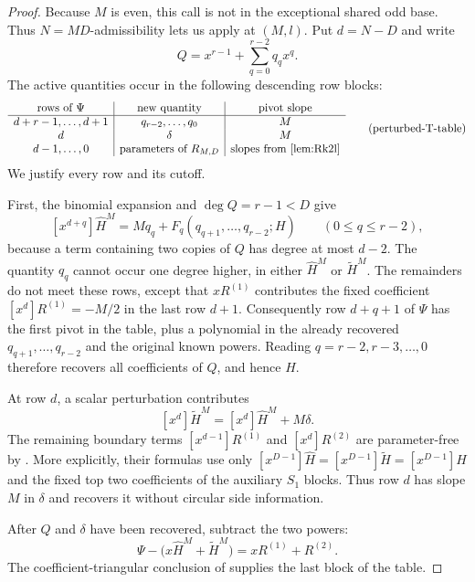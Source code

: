 \begin{proof}
Because $M$ is even, this call is not in the exceptional shared odd base.
Thus $N=MD$-admissibility lets us apply
 at $(M,l)$.
Put $d=N-D$ and write
\[
  Q=x^{r-1}+\sum_{q=0}^{r-2}q_qx^q .
\]
The active quantities occur in the following descending row blocks:
\[
\begin{array}{c|c|c}
  \text{rows of }\Psi&\text{new quantity}&\text{pivot slope}\\ \hline
  d+r-1,\ldots,d+1&q_{r-2},\ldots,q_0&M\\
  d&\delta&M\\
  d-1,\ldots,0&\text{parameters of }R_{M,D}&
       \text{slopes from \Cref{lem:Rk2l}}
\end{array}
\tag{perturbed-T-table}
\]
We justify every row and its cutoff.

First, the binomial expansion and $\deg Q=r-1<D$ give
\[
 [x^{d+q}]\widehat H^M
   =M q_q+F_q(q_{q+1},\ldots,q_{r-2};H)
   \qquad(0\le q\le r-2),
\tag{perturbed-power-pivot}
\]
because a term containing two copies of $Q$ has degree at most $d-2$.
The quantity $q_q$ cannot occur one degree higher, in either
$\widehat H^M$ or $\widetilde H^M$.  The remainders do not meet these rows,
except that $xR^{(1)}$ contributes the fixed coefficient
$[x^d]R^{(1)}=-M/2$ in the last row $d+1$.  Consequently row $d+q+1$ of
$\Psi$ has the first pivot in the table, plus a polynomial in the already
recovered $q_{q+1},\ldots,q_{r-2}$ and the original known powers.  Reading
$q=r-2,r-3,\ldots,0$ therefore recovers all coefficients of $Q$, and hence
$\widehat H$.

At row $d$, a scalar perturbation contributes
\[
 [x^d]\widetilde H^M=[x^d]\widehat H^M+M\delta .
\]
The remaining boundary terms $[x^{d-1}]R^{(1)}$ and
$[x^d]R^{(2)}$ are parameter-free by
.  More explicitly, their formulas use only
$[x^{D-1}]\widehat H=[x^{D-1}]\widetilde H=[x^{D-1}]H$ and the fixed top
two coefficients of the auxiliary $S_1$ blocks.  Thus row $d$ has slope
$M$ in $\delta$ and recovers it without circular side information.

After $Q$ and $\delta$ have been recovered, subtract the two powers:
\[
 \Psi-\bigl(x\widehat H^M+\widetilde H^M\bigr)
       =xR^{(1)}+R^{(2)} .
\]
The coefficient-triangular conclusion of  supplies the last
block of the table.


\end{proof}
